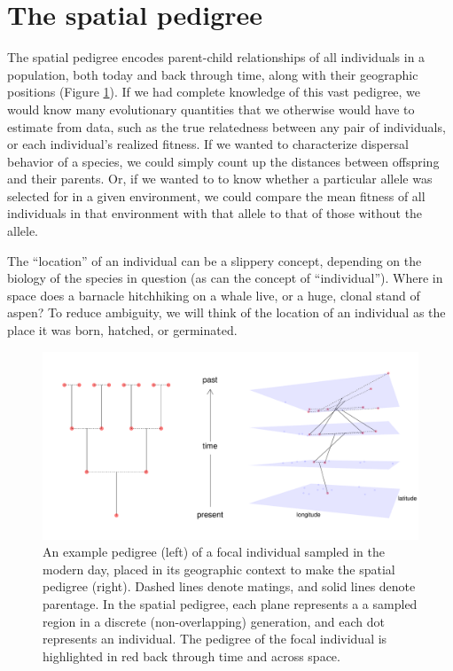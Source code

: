 \documentclass{ar-1col}
\begin{document}
\section{The spatial pedigree}

The spatial pedigree 
encodes parent-child relationships of all individuals in a population,
both today and back through time,
along with their geographic positions (Figure \ref{spatial_pedigree}).
If we had complete knowledge of this vast pedigree,
we would know many evolutionary quantities
that we otherwise would have to estimate from data,
such as the true relatedness between any pair of individuals,
or each individual's realized fitness.
If we wanted to characterize dispersal behavior of a species,
we could simply count up the distances between offspring and their parents.
Or, if we wanted to to know whether a particular allele
was selected for in a given environment,
we could compare the mean fitness of all individuals in that environment with that allele
to that of those without the allele.

The ``location'' of an individual can be a slippery concept,
depending on the biology of the species in question
(as can the concept of ``individual'').
Where in space does a barnacle hitchhiking on a whale live, 
or a huge, clonal stand of aspen?
To reduce ambiguity,
we will think of the location of an individual as the place it was
born, hatched, or germinated.

\begin{figure}
    \centering
         \includegraphics[width=\linewidth]{figs/spatial_pedigree.pdf}
        \caption{
		An example pedigree (left) of a focal individual sampled in the modern day, 
	   	placed in its geographic context to make the spatial pedigree (right).
		Dashed lines denote matings, and solid lines denote parentage.
		In the spatial pedigree, 
		each plane represents a a sampled region in a discrete (non-overlapping) generation,
		and each dot represents an individual.
		The pedigree of the focal individual is highlighted in red 
		back through time and across space.
        }
        \label{spatial_pedigree}
\end{figure}
\end{document}
